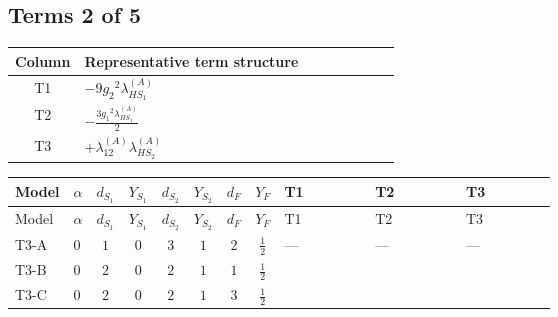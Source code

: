\documentclass[8pt]{article}
\begin{document}
\begin{landscape}
\subsection*{Terms 2 of 5}
\begin{center}
\begin{tabular}{@{}c >{\raggedright\arraybackslash}p{0.82\linewidth}@{}}
\toprule
Column & Representative term structure \\
\midrule
T1 & \(\displaystyle -9 {g_2}^2 {\lambda_{HS_1}^{(A)}}\) \\
\midrule
T2 & \(\displaystyle -\frac{3 {g_1}^2 {\lambda_{HS_1}^{(A)}}}{2}\) \\
\midrule
T3 & \(\displaystyle +{\lambda_{12}^{(A)}} {\lambda_{HS_2}^{(A)}}\) \\
\midrule
\bottomrule
\end{tabular}
\end{center}
\smallskip
\tiny
\begin{longtable}{@{}llcccccc >{\raggedright\arraybackslash}p{0.21\linewidth} >{\raggedright\arraybackslash}p{0.21\linewidth} >{\raggedright\arraybackslash}p{0.21\linewidth}@{}}
\toprule
Model & $\alpha$ & $d_{S_1}$ & $Y_{S_1}$ & $d_{S_2}$ & $Y_{S_2}$ & $d_F$ & $Y_F$ & T1 & T2 & T3 \\
\midrule
\endfirsthead
\toprule
Model & $\alpha$ & $d_{S_1}$ & $Y_{S_1}$ & $d_{S_2}$ & $Y_{S_2}$ & $d_F$ & $Y_F$ & T1 & T2 & T3 \\
\midrule
\endhead
T3-A & $0$ & $1$ & $0$ & $3$ & $1$ & $2$ & $\frac{1}{2}$ & --- & --- & --- \\
\midrule
T3-B & $0$ & $2$ & $0$ & $2$ & $1$ & $1$ & $\frac{1}{2}$ & \scriptsize\adjustbox{max width=\linewidth}{$\begin{gathered} -9 {g_2}^2 {\lambda_{HS_1}^{(A)}}\end{gathered}$} & \scriptsize\adjustbox{max width=\linewidth}{$\begin{gathered} -\frac{3 {g_1}^2 {\lambda_{HS_1}^{(A)}}}{2}\end{gathered}$} & \scriptsize\adjustbox{max width=\linewidth}{$\begin{gathered} +{\lambda_{12}^{(A)}} {\lambda_{HS_2}^{(A)}}\end{gathered}$} \\
\midrule
T3-C & $0$ & $2$ & $0$ & $2$ & $1$ & $3$ & $\frac{1}{2}$ & \scriptsize\adjustbox{max width=\linewidth}{$\begin{gathered} -9 {g_2}^2 {\lambda_{HS_1}^{(A)}}\end{gathered}$} & \scriptsize\adjustbox{max width=\linewidth}{$\begin{gathered} -\frac{3 {g_1}^2 {\lambda_{HS_1}^{(A)}}}{2}\end{gathered}$} & \scriptsize\adjustbox{max width=\linewidth}{$\begin{gathered} +{\lambda_{12}^{(A)}} {\lambda_{HS_2}^{(A)}}\end{gathered}$} \\

\end{longtable}
\end{landscape}
\end{document}
